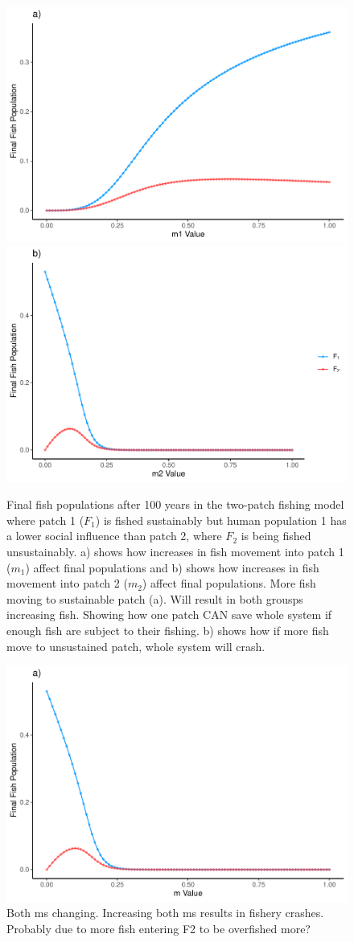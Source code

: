\documentclass[
]{article}
\begin{document}
\begin{figure}
\includegraphics[width=0.5\linewidth]{SubmissionFigs_files/figure-latex/mExploreGraph-1} \includegraphics[width=0.5\linewidth]{SubmissionFigs_files/figure-latex/mExploreGraph-2} \caption{Final fish populations after 100 years in the two-patch fishing model where patch 1 (\(F_1\)) is fished sustainably but human population 1 has a lower social influence than patch 2, where \(F_2\) is being fished unsustainably. a) shows how increases in fish movement into patch 1 (\(m_1\)) affect final populations and b) shows how increases in fish movement into patch 2 (\(m_2\)) affect final populations. More fish moving to sustainable patch (a). Will result in both grousps increasing fish. Showing how one patch CAN save whole system if enough fish are subject to their fishing. b) shows how if more fish move to unsustained patch, whole system will crash. \label{mExploreGraph}}\label{fig:mExploreGraph}
\end{figure}



\begin{figure}
\centering
\includegraphics{SubmissionFigs_files/figure-latex/mExploreGraphBoth-1.pdf}
\caption{\label{fig:mExploreGraphBoth}Both ms changing. Increasing both ms results in fishery crashes. Probably due to more fish entering F2 to be overfished more? \label{mExploreGraphBoth}}
\end{figure}
\end{document}
